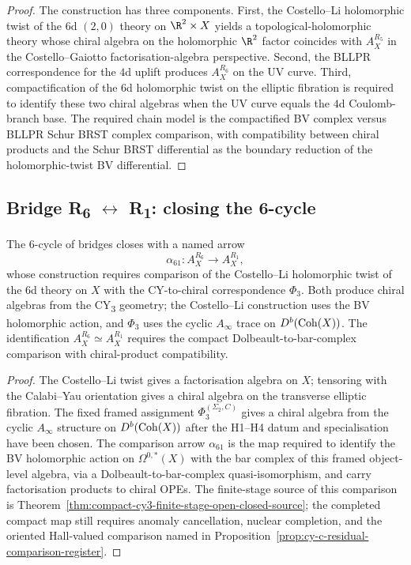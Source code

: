 \begin{proof}
The construction has three components. First, the Costello--Li
holomorphic twist of the $6$d $(2,0)$ theory on $\R^2 \times X$ yields a
topological-holomorphic theory whose chiral algebra on the holomorphic
$\R^2$ factor coincides with $A_X^{R_5}$ in the Costello--Gaiotto
factorisation-algebra perspective. Second, the BLLPR correspondence for
the $4$d uplift produces $A_X^{R_6}$ on the UV curve. Third,
compactification of the $6$d holomorphic twist on the elliptic fibration
is required to identify these two chiral algebras when the UV curve equals the
$4$d Coulomb-branch base. The required chain model is the compactified
BV complex versus BLLPR Schur BRST complex comparison, with compatibility
between chiral products and the Schur BRST differential as the boundary
reduction of the holomorphic-twist BV differential.
\end{proof}

\subsection{\texorpdfstring{Bridge R\textsubscript{6} $\leftrightarrow$ R\textsubscript{1}: closing the 6-cycle}{Bridge R6 <-> R1: closing the 6-cycle}}

\begin{proposition}
\label{prop:route6-route1-closure}
The $6$-cycle of bridges closes with a named arrow
\[
 \alpha_{61} \colon A_X^{R_6} \longrightarrow A_X^{R_1},
\]
whose construction requires comparison of the Costello--Li holomorphic
twist of the $6$d theory on $X$ with the CY-to-chiral correspondence
$\Phi_3$. Both produce chiral algebras from the CY\textsubscript{3}
geometry; the Costello--Li construction uses the BV holomorphic action,
and $\Phi_3$ uses the cyclic $A_\infty$ trace on $D^b(\mathrm{Coh}(X))$. The
identification $A_X^{R_6} \simeq A_X^{R_1}$ requires the compact
Dolbeault-to-bar-complex comparison with chiral-product compatibility.
\end{proposition}

\begin{proof}
The Costello--Li twist gives a factorisation algebra on $X$; tensoring with the Calabi--Yau orientation gives a chiral algebra on the transverse elliptic fibration. The fixed framed assignment $\Phi_3^{(\Sigma_2,C)}$ gives a chiral algebra from the cyclic $A_\infty$ structure on $D^b(\mathrm{Coh}(X))$ after the H1--H4 datum and specialisation have been chosen. The comparison arrow $\alpha_{61}$ is the map required to identify the BV holomorphic action on $\Omega^{0,*}(X)$ with the bar complex of this framed object-level algebra, via a Dolbeault-to-bar-complex quasi-isomorphism, and carry factorisation products to chiral OPEs. The finite-stage source of this comparison is Theorem~\ref{thm:compact-cy3-finite-stage-open-closed-source}; the completed compact map still requires anomaly cancellation, nuclear completion, and the oriented Hall-valued comparison named in Proposition~\ref{prop:cy-c-residual-comparison-register}.
\end{proof}

